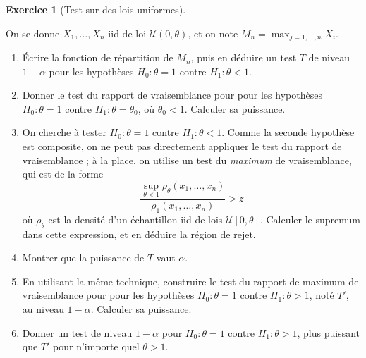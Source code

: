 \documentclass[
  10,
  letterpaper,
  DIV=11,
  numbers=noendperiod]{scrreport}
\providecommand{\tightlist}{%
  \setlength{\itemsep}{0pt}\setlength{\parskip}{0pt}}\usepackage{longtable,booktabs,array}
\theoremstyle{plain}
\theoremstyle{definition}
\newtheorem{exercise}{Exercice}[chapter]
\theoremstyle{plain}
\theoremstyle{definition}
\theoremstyle{definition}
\theoremstyle{plain}
\theoremstyle{remark}
\begin{document}
\begin{exercise}[Test sur des lois
uniformes]\protect\hypertarget{exr-testunif}{}\label{exr-testunif}

On se donne \(X_1, \dots, X_n\) iid de loi \(\mathscr{U}(0,\theta)\), et
on note \(M_n = \max_{j=1, \dots, n} X_i\).

\begin{enumerate}
\def\labelenumi{\arabic{enumi}.}
\tightlist
\item
  Écrire la fonction de répartition de \(M_n\), puis en déduire un test
  \(T\) de niveau \(1-\alpha\) pour les hypothèses \(H_0: \theta = 1\)
  contre \(H_1: \theta < 1\).
\item
  Donner le test du rapport de vraisemblance pour pour les hypothèses
  \(H_0: \theta = 1\) contre \(H_1: \theta = \theta_0\), où
  \(\theta_0<1\). Calculer sa puissance.
\item
  On cherche à tester \(H_0: \theta = 1\) contre \(H_1: \theta < 1\).
  Comme la seconde hypothèse est composite, on ne peut pas directement
  appliquer le test du rapport de vraisemblance ; à la place, on utilise
  un test du \emph{maximum} de vraisemblance, qui est de la forme
  \[ \frac{\sup_{\theta < 1}\rho_\theta(x_1, \dotsc, x_n)}{\rho_1(x_1, \dotsc, x_n)} > z\]
  où \(\rho_\theta\) est la densité d'un échantillon iid de lois
  \(\mathscr{U}[0,\theta]\). Calculer le supremum dans cette expression,
  et en déduire la région de rejet.
\item
  Montrer que la puissance de \(T\) vaut \(\alpha\).
\item
  En utilisant la même technique, construire le test du rapport de
  maximum de vraisemblance pour pour les hypothèses \(H_0: \theta = 1\)
  contre \(H_1: \theta>1\), noté \(T'\), au niveau \(1-\alpha\).
  Calculer sa puissance.
\item
  Donner un test de niveau \(1-\alpha\) pour \(H_0: \theta = 1\) contre
  \(H_1: \theta>1\), plus puissant que \(T'\) pour n'importe quel
  \(\theta >1\).
\end{enumerate}

\end{exercise}
\end{document}
